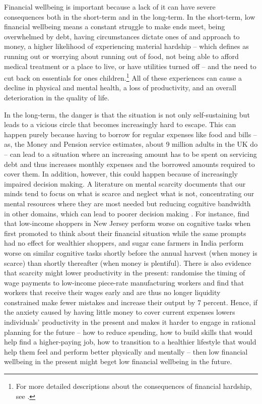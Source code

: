 Financial wellbeing is important because a lack of it can have severe
consequences both in the short-term and in the long-term. In the short-term,
low financial wellbeing means a constant struggle to make ends meet, being
overwhelmed by debt, having circumstances dictate ones of and approach to
money, a higher likelihood of experiencing material hardship -- which
\citep{cfpb2017financial} defines as running out or worrying about running out
of food, not being able to afford medical treatment or a place to live, or have
utilities turned off -- and the need to cut back on essentials for ones
children.\footnote{For more detailed descriptions about the consequences of
    financial hardship, see \citet{cfpb2017financial, mps2018building,
stepchange2017strengthening}.} All of these experiences can cause a decline in
physical and mental health, a loss of productivity, and an overall
deterioration in the quality of life.

In the long-term, the danger is that the situation is not only self-sustaining
but leads to a vicious circle that becomes increasingly hard to escape. This
can happen purely because having to borrow for regular expenses like food and
bills -- as, the Money and Pension service estimates, about 9 million adults in
the UK do \citep{mps2018building} -- can lead to a situation where an
increasing amount has to be spent on servicing debt and thus increases monthly
expenses and the borrowed amounts required to cover them. In addition, however,
this could happen because of increasingly impaired decision making. A
literature on mental scarcity documents that our minds tend to focus on what is
scarce and neglect what is not, concentrating our mental resources where they
are most needed but reducing cognitive bandwidth in other domains, which can
lead to poorer decision making \citep{shah2012some, mullainathan2013scarcity,
haushofer2014psychology}. For instance, \citet{mani2013poverty} find that
low-income shoppers in New Jersey perform worse on cognitive tasks when first
promoted to think about their financial situation while the same prompts had no
effect for wealthier shoppers, and sugar cane farmers in India perform worse on
similar cognitive tasks shortly before the annual harvest (when money is
scarce) than shortly thereafter (when money is plentiful). There is also
evidence that scarcity might lower productivity in the present:
\citet{kaur2021financial} randomise the timing of wage payments to low-income
piece-rate manufacturing workers and find that workers that receive their wages
early and are thus no longer liquidity constrained make fewer mistakes and
increase their output by 7 percent. Hence, if the anxiety caused by having
little money to cover current expenses lowers individuals' productivity in the
present and makes it harder to engage in rational planning for the future --
how to reduce spending, how to build skills that would help find a
higher-paying job, how to transition to a healthier lifestyle that would help
them feel and perform better physically and mentally -- then low financial
wellbeing in the present might beget low financial wellbeing in the future.

